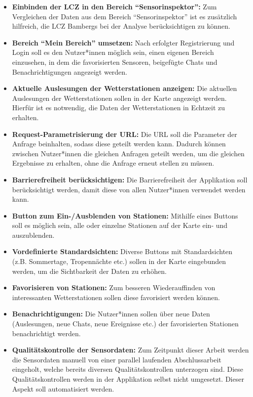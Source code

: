 \begin{itemize}
    \item \textbf{Einbinden der \ac{LCZ} in den Bereich \enquote{Sensorinspektor}:} Zum Vergleichen der Daten aus dem Bereich \enquote{Sensorinspektor} ist es zusätzlich hilfreich, die \ac{LCZ} Bambergs bei der Analyse berücksichtigen zu können.
    \item \textbf{Bereich \enquote{Mein Bereich} umsetzen:} Nach erfolgter Registrierung und Login soll es den Nutzer*innen möglich sein, einen eigenen Bereich einzusehen, in dem die favorisierten Sensoren, beigefügte Chats und Benachrichtigungen angezeigt werden.
    \item \textbf{Aktuelle Auslesungen der Wetterstationen anzeigen:} Die aktuellen Auslesungen der Wetterstationen sollen in der Karte angezeigt werden. Hierfür ist es notwendig, die Daten der Wetterstationen in Echtzeit zu erhalten.
    \item \textbf{Request-Parametrisierung der URL:} Die URL soll die Parameter der Anfrage beinhalten, sodass diese geteilt werden kann. Dadurch können zwischen Nutzer*innen die gleichen Anfragen geteilt werden, um die gleichen Ergebnisse zu erhalten, ohne die Anfrage erneut stellen zu müssen.
    \item \textbf{Barrierefreiheit berücksichtigen:} Die Barrierefreiheit der Applikation soll berücksichtigt werden, damit diese von allen Nutzer*innen verwendet werden kann.
    \item \textbf{Button zum Ein-/Ausblenden von Stationen:} Mithilfe eines Buttons soll es möglich sein, alle oder einzelne Stationen auf der Karte ein- und auszublenden.
    \item \textbf{Vordefinierte Standardsichten:} Diverse Buttons mit Standardsichten (z.B. Sommertage, Tropennächte etc.) sollen in der Karte eingebunden werden, um die Sichtbarkeit der Daten zu erhöhen.
    \item \textbf{Favorisieren von Stationen:} Zum besseren Wiederauffinden von interessanten Wetterstationen sollen diese favorisiert werden können.
    \item \textbf{Benachrichtigungen:} Die Nutzer*innen sollen über neue Daten (Auslesungen, neue Chats, neue Ereignisse etc.) der favorisierten Stationen benachrichtigt werden.
    \item \textbf{Qualitätskontrolle der Sensordaten:} Zum Zeitpunkt dieser Arbeit werden die Sensordaten manuell von einer parallel laufenden Abschlussarbeit eingeholt, welche bereits diversen Qualitätskontrollen unterzogen sind. Diese Qualitätskontrollen werden in der Applikation selbst nicht umgesetzt. Dieser Aspekt soll automatisiert werden. 
\end{itemize}

